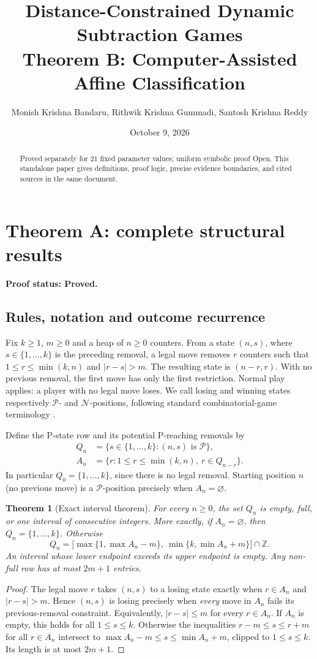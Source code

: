 \documentclass[11pt]{article}
\title{\textbf{Distance-Constrained Dynamic Subtraction Games}\\[0.4em]Theorem B: Computer-Assisted Affine Classification}
\author{Monish Krishna Bandaru, Rithwik Krishna Gummadi, Santosh Krishna Reddy}
\date{October 9, 2026}
\newtheorem{theorem}{Theorem}[section]
\newcommand{\Pset}{\mathcal{P}}
\newcommand{\Nset}{\mathcal{N}}
\newcommand{\statusproved}{\textbf{Proof status: Proved.}}
\begin{document}
\maketitle
\begin{abstract}Proved separately for 21 fixed parameter values; uniform symbolic proof Open. This standalone paper gives definitions, proof logic, precise evidence boundaries, and cited sources in the same document.\end{abstract}
\tableofcontents
\section{Theorem A: complete structural results}\label{sec:A}
\statusproved
\subsection{Rules, notation and outcome recurrence}
Fix $k\ge1$, $m\ge0$ and a heap of $n\ge0$ counters. From a state $(n,s)$, where $s\in\{1,\ldots,k\}$ is the preceding removal, a legal move removes $r$ counters such that $1\le r\le\min(k,n)$ and $|r-s|>m$. The resulting state is $(n-r,r)$. With no previous removal, the first move has only the first restriction. Normal play applies: a player with no legal move loses. We call losing and winning states respectively $\Pset$- and $\Nset$-positions, following standard combinatorial-game terminology \cite{sprague1935,grundy1939,winningways2001}.

Define the P-state row and its potential P-reaching removals by
\begin{align}
Q_n&=\{s\in\{1,\ldots,k\}:(n,s)\text{ is }\Pset\},\\
A_n&=\{r:1\le r\le\min(k,n),\ r\in Q_{n-r}\}.
\end{align}
In particular $Q_0=\{1,\ldots,k\}$, since there is no legal removal. Starting position $n$ (no previous move) is a $\Pset$-position precisely when $A_n=\varnothing$.

\begin{theorem}[Exact interval theorem]\label{thm:Ainterval}
For every $n\ge0$, the set $Q_n$ is empty, full, or one interval of consecutive integers. More exactly, if $A_n=\varnothing$, then $Q_n=\{1,\ldots,k\}$. Otherwise
\[
\boxed{Q_n=\bigl[\max\{1,\max A_n-m\},\ \min\{k,\min A_n+m\}\bigr]\cap\mathbb Z.}
\]
An interval whose lower endpoint exceeds its upper endpoint is empty. Any non-full row has at most $2m+1$ entries.
\end{theorem}
\begin{proof}
The legal move $r$ takes $(n,s)$ to a losing state exactly when $r\in A_n$ and $|r-s|>m$. Hence $(n,s)$ is losing precisely when \emph{every} move in $A_n$ fails its previous-removal constraint. Equivalently, $|r-s|\le m$ for every $r\in A_n$. If $A_n$ is empty, this holds for all $1\le s\le k$. Otherwise the inequalities $r-m\le s\le r+m$ for all $r\in A_n$ intersect to $\max A_n-m\le s\le\min A_n+m$, clipped to $1\le s\le k$. Its length is at most $2m+1$.
\end{proof}
\end{document}
